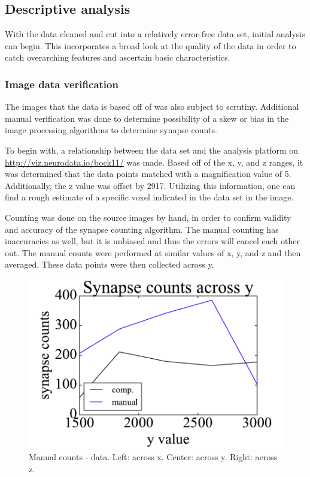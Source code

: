 \documentclass{article}
\begin{document}
\subsection{Descriptive analysis}

With the data cleaned and cut into a relatively error-free data set, initial analysis can begin. This incorporates a broad look at the quality of the data in order to catch overarching features and ascertain basic characteristics.

\subsubsection{Image data verification}

The images that the data is based off of was also subject to scrutiny. Additional manual verification was done to determine possibility of a skew or bias in the image processing algorithms to determine synapse counts.

To begin with, a relationship between the data set and the analysis platform on \url{http://viz.neurodata.io/bock11/} was made. Based off of the x, y, and z ranges, it was determined that the data points matched with a magnification value of 5. Additionally, the z value was offset by 2917. Utilizing this information, one can find a rough estimate of a specific voxel indicated in the data set in the image.

Counting was done on the source images by hand, in order to confirm validity and accuracy of the synapse counting algorithm. The manual counting has inaccuracies as well, but it is unbiased and thus the errors will cancel each other out. The manual counts were performed at similar values of x, y, and z and then averaged. These data points were then collected across y.

\begin{figure}[h]
  \centering
  \includegraphics[scale=.3]{Fig1}
  \caption{Manual counts - data. Left: across x. Center: across y. Right: across z.}
\end{figure}
\end{document}
